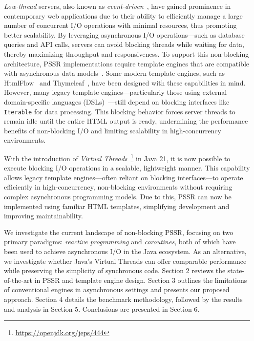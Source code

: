 \textit{Low-thread} servers, also known as
\textit{event-driven}~\cite{event-driven-servers}, have gained prominence in
contemporary web applications due to their ability to efficiently manage a large
number of concurrent I/O operations with minimal resources, thus promoting
better scalability.
By leveraging asynchronous I/O operations—such as
database queries and API calls, servers can avoid blocking threads while
waiting for data, thereby maximizing throughput and responsiveness. To support
this non-blocking architecture, PSSR implementations require template engines
that are compatible with asynchronous data models~\cite{carvalho2023async}.
Some modern template
engines, such as HtmlFlow~\cite{htmlflow} and Thymeleaf~\cite{thymeleaf}, have
been designed with these capabilities in mind. However, many legacy
template engines—particularly those using external domain-specific languages
(DSLs)~\cite{Fowler03}—still depend on blocking interfaces like
\texttt{Iterable} for data processing. This blocking behavior forces server
threads to remain idle until the entire HTML output is ready, undermining the
performance benefits of non-blocking I/O and limiting scalability in
high-concurrency environments.

With the introduction of \textit{Virtual
    Threads}~\footnote{\url{https://openjdk.org/jeps/444}} in Java 21, it is now
possible to execute blocking I/O operations in a scalable, lightweight manner.
This capability allows legacy template engines—often reliant on blocking
interfaces—to operate efficiently in high-concurrency, non-blocking
environments without requiring complex asynchronous programming models. Due to this, PSSR can now be implemented using familiar HTML templates, simplifying
development and improving maintainability.

We investigate the current landscape of non-blocking PSSR, focusing on two
primary paradigms: \textit{reactive programming} and \textit{coroutines}, both
of which have been used to achieve asynchronous I/O in the Java ecosystem. As
an alternative, we investigate whether Java’s Virtual Threads can offer
comparable performance while preserving the simplicity of synchronous code.
Section 2 reviews the state-of-the-art in PSSR and template engine design.
Section 3 outlines the limitations of conventional engines in asynchronous
settings and presents our proposed approach. Section 4 details the benchmark
methodology, followed by the results and analysis in Section 5. Conclusions are
presented in Section 6.